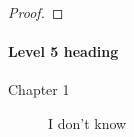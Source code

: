\begin{proof}

\end{proof}

\paragraph{Level 5 heading}

\begin{corollary}

\end{corollary}

\begin{proposition}

\end{proposition}

\begin{note}

\end{note}

\begin{remark}

\end{remark}

\begin{lemma}

\end{lemma}

\begin{description}
	\item[Chapter 1] I don't know
\end{description}


